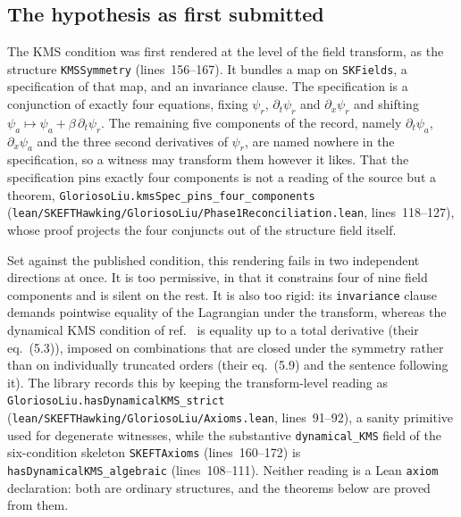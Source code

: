 \documentclass[11pt]{article}
\begin{document}
\subsection{The hypothesis as first submitted}

The KMS condition was first rendered at the level of the field
transform, as the structure \texttt{KMSSymmetry} (lines~156--167). It
bundles a map on \texttt{SKFields}, a specification of that map, and an
invariance clause. The specification is a conjunction of exactly four
equations, fixing $\psi_r$, $\partial_t\psi_r$ and $\partial_x\psi_r$
and shifting $\psi_a \mapsto \psi_a + \beta\,\partial_t\psi_r$. The
remaining five components of the record, namely
$\partial_t\psi_a$, $\partial_x\psi_a$ and the three second derivatives
of $\psi_r$, are named nowhere in the specification, so a witness may
transform them however it likes. That the specification pins exactly
four components is not a reading of the source but a theorem,
\texttt{GloriosoLiu.kmsSpec\_pins\_four\_components}
(\texttt{lean/SKEFTHawking/GloriosoLiu/Phase1Reconciliation.lean},
lines~118--127), whose proof projects the four conjuncts out of the
structure field itself.

Set against the published condition, this rendering fails in two
independent directions at once. It is too permissive, in that it
constrains four of nine field components and is silent on the rest. It
is also too rigid: its \texttt{invariance} clause demands pointwise
equality of the Lagrangian under the transform, whereas the dynamical
KMS condition of ref.~\cite{GloriosoCrossleyLiu2017} is equality up to a
total derivative (their eq.~(5.3)), imposed on combinations that are
closed under the symmetry rather than on individually truncated orders
(their eq.~(5.9) and the sentence following it). The library records
this by keeping the transform-level reading as
\texttt{GloriosoLiu.hasDynamicalKMS\_strict}
(\texttt{lean/SKEFTHawking/GloriosoLiu/Axioms.lean}, lines~91--92), a
sanity primitive used for degenerate witnesses, while the substantive
\texttt{dynamical\_KMS} field of the six-condition skeleton
\texttt{SKEFTAxioms} (lines~160--172) is
\texttt{hasDynamicalKMS\_algebraic} (lines~108--111). Neither reading is
a Lean \texttt{axiom} declaration: both are ordinary structures, and the
theorems below are proved from them.
\end{document}
